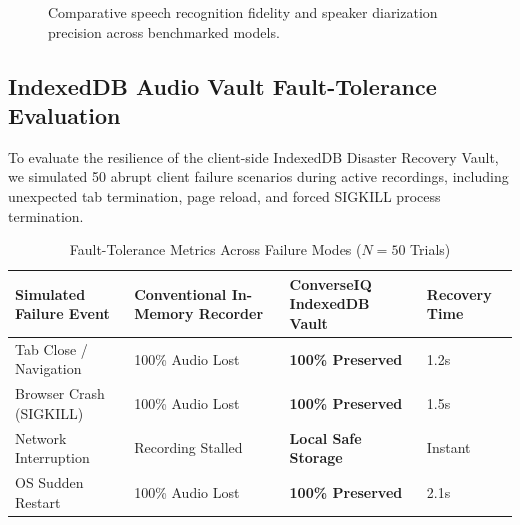 \documentclass[conference]{IEEEtran}
\begin{document}
\begin{figure}[htbp]
\centering
{}
\caption{Comparative speech recognition fidelity and speaker diarization precision across benchmarked models.}
\label{fig:speech_bar}
\end{figure}

\subsection{IndexedDB Audio Vault Fault-Tolerance Evaluation}
To evaluate the resilience of the client-side IndexedDB Disaster Recovery Vault, we simulated 50 abrupt client failure scenarios during active recordings, including unexpected tab termination, page reload, and forced SIGKILL process termination.

\begin{table}[htbp]
\caption{Fault-Tolerance Metrics Across Failure Modes ($N=50$ Trials)}
\centering
\begin{tabularx}{\columnwidth}{lXXX}
\toprule
\textbf{Simulated Failure Event} & \textbf{Conventional In-Memory Recorder} & \textbf{ConverseIQ IndexedDB Vault} & \textbf{Recovery Time} \\
\midrule
Tab Close / Navigation & 100\% Audio Lost & \textbf{100\% Preserved} & 1.2s \\
Browser Crash (SIGKILL) & 100\% Audio Lost & \textbf{100\% Preserved} & 1.5s \\
Network Interruption & Recording Stalled & \textbf{Local Safe Storage} & Instant \\
OS Sudden Restart & 100\% Audio Lost & \textbf{100\% Preserved} & 2.1s \\
\bottomrule
\end{tabularx}
\label{tab:vault_metrics}
\end{table}
\end{document}
